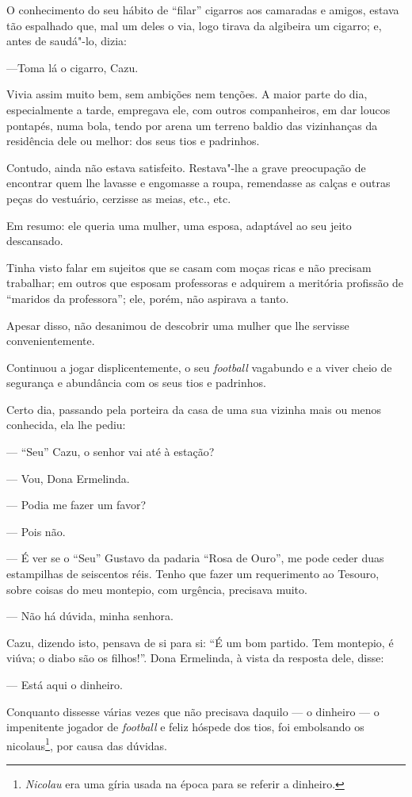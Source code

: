 O conhecimento do seu hábito de ``filar'' cigarros aos camaradas e
amigos, estava tão espalhado que, mal um deles o via, logo tirava da
algibeira um cigarro; e, antes de saudá"-lo, dizia:

---Toma lá o cigarro, Cazu.

Vivia assim muito bem, sem ambições nem tenções. A maior parte do dia,
especialmente a tarde, empregava ele, com outros companheiros, em dar
loucos pontapés, numa bola, tendo por arena um terreno baldio das
vizinhanças da residência dele ou melhor: dos seus tios e padrinhos.

Contudo, ainda não estava satisfeito. Restava"-lhe a grave preocupação de
encontrar quem lhe lavasse e engomasse a roupa, remendasse as calças e
outras peças do vestuário, cerzisse as meias, etc., etc.

Em resumo: ele queria uma mulher, uma esposa, adaptável ao seu jeito
descansado.

Tinha visto falar em sujeitos que se casam com moças ricas e não
precisam trabalhar; em outros que esposam professoras e adquirem a
meritória profissão de ``maridos da professora''; ele, porém, não
aspirava a tanto.

Apesar disso, não desanimou de descobrir uma mulher que lhe servisse
convenientemente.

Continuou a jogar displicentemente, o seu \emph{football} vagabundo e a
viver cheio de segurança e abundância com os seus tios e padrinhos.

Certo dia, passando pela porteira da casa de uma sua vizinha mais ou
menos conhecida, ela lhe pediu:

--- ``Seu'' Cazu, o senhor vai até à estação?

--- Vou, Dona Ermelinda.

--- Podia me fazer um favor?

--- Pois não.

--- É ver se o ``Seu'' Gustavo da padaria ``Rosa de Ouro'', me pode
ceder duas estampilhas de seiscentos réis. Tenho que fazer um
requerimento ao Tesouro, sobre coisas do meu montepio, com urgência,
precisava muito.

--- Não há dúvida, minha senhora.

Cazu, dizendo isto, pensava de si para si: ``É um bom partido. Tem
montepio, é viúva; o diabo são os filhos!''. Dona Ermelinda, à vista da
resposta dele, disse:

--- Está aqui o dinheiro.

Conquanto dissesse várias vezes que não precisava daquilo --- o dinheiro
--- o impenitente jogador de \emph{football} e feliz hóspede dos tios,
foi embolsando os nicolaus\footnote{\emph{Nicolau} era uma gíria usada
  na época para se referir a dinheiro.}, por causa das dúvidas.

